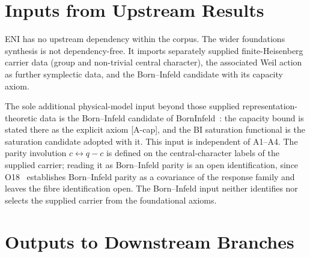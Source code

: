 \documentclass[11pt,a4paper]{article}
\theoremstyle{definition}
\begin{document}
  \section{Inputs from Upstream Results}
    \label{sec:inputs}

    ENI has no upstream dependency within the corpus.
    The wider foundations synthesis is not dependency-free. It imports separately supplied
    finite-Heisenberg carrier data (group and non-trivial central character), the associated
    Weil action as further symplectic data, and the Born--Infeld candidate with its capacity axiom.

    The sole additional physical-model input beyond those supplied representation-theoretic data is
    the Born--Infeld candidate of BornInfeld~\cite{Beau2026c}: the capacity bound is stated there as the explicit
    axiom [A-cap], and the BI saturation functional is the saturation candidate
    adopted with it.
    This input is independent of A1--A4.
    The parity involution $c \leftrightarrow q-c$ is defined on the central-character labels of the
    supplied carrier; reading it as Born--Infeld parity is an open identification, since
    O18~\cite{Beau2026a22} establishes Born--Infeld parity as a covariance of the response family and leaves the fibre
    identification open.
    The Born--Infeld input neither identifies nor selects the supplied carrier from the
    foundational axioms.

  \section{Outputs to Downstream Branches}
    \label{sec:outputs}
\end{document}
